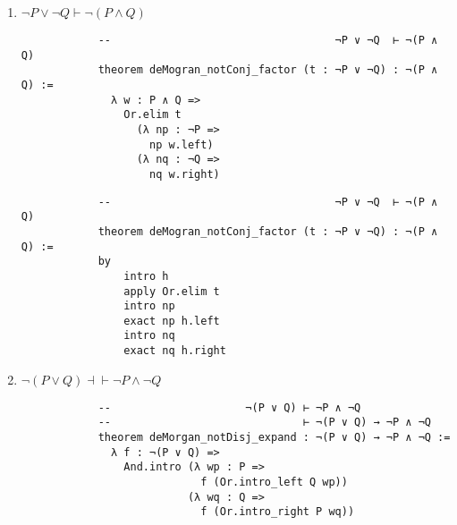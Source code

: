 \documentclass[11pt]{report}
\begin{document}
\begin{enumerate}
\begin{enumerate}
		Here are the proofs about currying, but written using tactics instead of providing the proof term explicitly. Tactic proofs still produce proof terms - that is how a proof is verified. One can use the ``\#print'' command to see the proof term obtained from the tactic proof. It will probably be similar, if not exactly the same, to your original proof term. 

		\begin{lstlisting}
			--                 (P ∧ Q) → R  ⊢ P → (Q → R)
			theorem curry (f : (P ∧ Q) → R) : P → (Q → R) :=
			by
				intro p q
				exact f (And.intro p q)

			--                   P → (Q → R)  ⊢ (P ∧ Q) → R
			theorem uncurry (f : P → (Q → R)) : (P ∧ Q) → R :=
			by
				intro h
				exact (f h.left) h.right

			--                 P → (Q → R) $\dashv$⊢ (P ∧ Q) → R
			theorem currying : P → (Q → R)  ↔ (P ∧ Q) → R :=
			by
				apply Iff.intro
				apply uncurry
				apply curry
		\end{lstlisting}
		
		\newpage
		\item $\lnot P\lor \lnot Q \vdash \lnot( P\land  Q)$
		
		\begin{lstlisting}
			--                                   ¬P ∨ ¬Q  ⊢ ¬(P ∧ Q)
			theorem deMogran_notConj_factor (t : ¬P ∨ ¬Q) : ¬(P ∧ Q) :=
			  λ w : P ∧ Q =>
				Or.elim t
				  (λ np : ¬P =>
					np w.left)
				  (λ nq : ¬Q =>
					nq w.right)
		\end{lstlisting}

		\begin{lstlisting}
			--                                   ¬P ∨ ¬Q  ⊢ ¬(P ∧ Q)
			theorem deMogran_notConj_factor (t : ¬P ∨ ¬Q) : ¬(P ∧ Q) :=
			by
				intro h
				apply Or.elim t
				intro np
				exact np h.left
				intro nq
				exact nq h.right
		\end{lstlisting}
		
		\newpage
		\item $\lnot( P\lor  Q) \dashv\vdash \lnot  P\land \lnot  Q$
		
		\begin{lstlisting}
			--                     ¬(P ∨ Q) ⊢ ¬P ∧ ¬Q
			--                              ⊢ ¬(P ∨ Q) → ¬P ∧ ¬Q
			theorem deMorgan_notDisj_expand : ¬(P ∨ Q) → ¬P ∧ ¬Q :=
			  λ f : ¬(P ∨ Q) =>
				And.intro (λ wp : P =>
							f (Or.intro_left Q wp))
						  (λ wq : Q =>
							f (Or.intro_right P wq))
			

\end{lstlisting}
\end{enumerate}
\end{enumerate}
\end{document}
